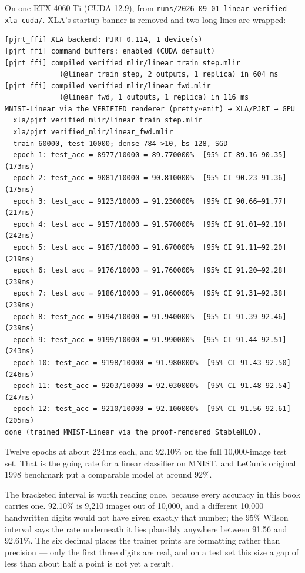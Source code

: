 On one RTX 4060 Ti (CUDA 12.9), from
\texttt{runs/2026-09-01-linear-verified-xla-cuda/}. XLA's startup banner is
removed and two long lines are wrapped:

\begin{verbatim}
[pjrt_ffi] XLA backend: PJRT 0.114, 1 device(s)
[pjrt_ffi] command buffers: enabled (CUDA default)
[pjrt_ffi] compiled verified_mlir/linear_train_step.mlir
             (@linear_train_step, 2 outputs, 1 replica) in 604 ms
[pjrt_ffi] compiled verified_mlir/linear_fwd.mlir
             (@linear_fwd, 1 outputs, 1 replica) in 116 ms
MNIST-Linear via the VERIFIED renderer (pretty∘emit) → XLA/PJRT → GPU
  xla/pjrt verified_mlir/linear_train_step.mlir
  xla/pjrt verified_mlir/linear_fwd.mlir
  train 60000, test 10000; dense 784->10, bs 128, SGD
  epoch 1: test_acc = 8977/10000 = 89.770000%  [95% CI 89.16–90.35] (173ms)
  epoch 2: test_acc = 9081/10000 = 90.810000%  [95% CI 90.23–91.36] (175ms)
  epoch 3: test_acc = 9123/10000 = 91.230000%  [95% CI 90.66–91.77] (217ms)
  epoch 4: test_acc = 9157/10000 = 91.570000%  [95% CI 91.01–92.10] (242ms)
  epoch 5: test_acc = 9167/10000 = 91.670000%  [95% CI 91.11–92.20] (219ms)
  epoch 6: test_acc = 9176/10000 = 91.760000%  [95% CI 91.20–92.28] (239ms)
  epoch 7: test_acc = 9186/10000 = 91.860000%  [95% CI 91.31–92.38] (239ms)
  epoch 8: test_acc = 9194/10000 = 91.940000%  [95% CI 91.39–92.46] (239ms)
  epoch 9: test_acc = 9199/10000 = 91.990000%  [95% CI 91.44–92.51] (243ms)
  epoch 10: test_acc = 9198/10000 = 91.980000%  [95% CI 91.43–92.50] (246ms)
  epoch 11: test_acc = 9203/10000 = 92.030000%  [95% CI 91.48–92.54] (247ms)
  epoch 12: test_acc = 9210/10000 = 92.100000%  [95% CI 91.56–92.61] (205ms)
done (trained MNIST-Linear via the proof-rendered StableHLO).
\end{verbatim}

Twelve epochs at about 224\,ms each, and 92.10\% on the full
10,000-image test set. That is the going rate for a linear classifier on
MNIST, and LeCun's original 1998 benchmark put a comparable model at
around 92\%.

The bracketed interval is worth reading once, because every accuracy in
this book carries one. 92.10\% is 9,210 images out of 10,000, and a
different 10,000 handwritten digits would not have given exactly that
number; the 95\% Wilson interval says the rate underneath it lies
plausibly anywhere between 91.56 and 92.61\%. The six decimal places the
trainer prints are formatting rather than precision --- only the first
three digits are real, and on a test set this size a gap of less than
about half a point is not yet a result.

